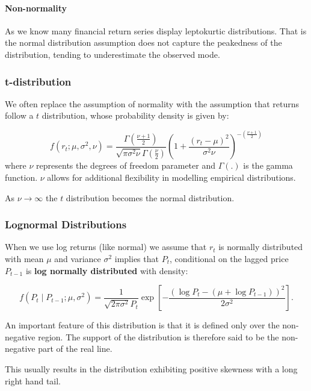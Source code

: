\documentclass[11pt]{article}
\begin{document}
\paragraph{Non-normality} \mbox{}

As we know many financial return series display leptokurtic distributions. That is the normal distribution assumption does not capture the peakedness of the distribution, tending to underestimate the observed mode.

\subsubsection{t-distribution}

We often replace the assumption of normality with the assumption that returns follow a $t$ distribution, whose probability density is given by:

\begin{equation}
f\left(r_t ; \mu, \sigma^2, \nu\right)=\frac{\Gamma\left(\frac{\nu+1}{2}\right)}{\sqrt{\pi \sigma^2 \nu} \Gamma\left(\frac{\nu}{2}\right)}\left(1+\frac{\left(r_t-\mu\right)^2}{\sigma^2 \nu}\right)^{-\left(\frac{\nu+1}{2}\right)}
\end{equation}
where $\nu$ represents the degrees of freedom parameter and $\Gamma(.)$ is the gamma function. $\nu$ allows for additional flexibility in modelling empirical distributions.

\begin{note}
    As $\nu\rightarrow\infty$ the $t$ distribution becomes the normal distribution.
\end{note}

\subsubsection{Lognormal Distributions}

When we use log returns (like normal) we assume that $r_t$ is normally distributed with mean $\mu$ and variance $\sigma^2$ implies that $P_t$, conditional on the lagged price $P_{t-1}$ is \textbf{log normally distributed} with density:

\begin{equation}
f\left(P_t \mid P_{t-1} ; \mu, \sigma^2\right)=\frac{1}{\sqrt{2 \pi \sigma^2} P_t} \exp \left[-\frac{\left(\log P_t-\left(\mu+\log P_{t-1}\right)\right)^2}{2 \sigma^2}\right] .
\end{equation}

\begin{note}
    An important feature of this distribution is that it is defined only over the non-negative region. The support of the distribution is therefore said to be the non-negative part of the real line.

    This usually results in the distribution exhibiting positive skewness with a long right hand tail.
\end{note}
\end{document}
